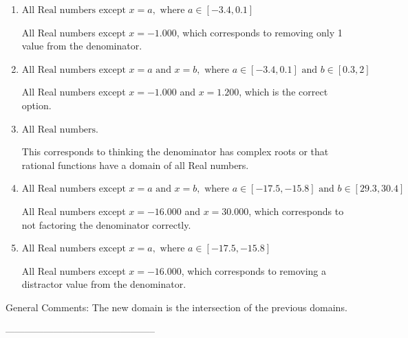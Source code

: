 \documentclass{article}[14pt]
\begin{document}
\begin{enumerate}[label=\Alph*.] 
\item $ \text{All Real numbers except } x = a, \text{ where } a \in [-3.4, 0.1] $ 

 All Real numbers except $x = -1.000$, which corresponds to removing only 1 value from the denominator. 
\item $ \text{All Real numbers except } x = a \text{ and } x = b, \text{ where } a \in [-3.4, 0.1] \text{ and } b \in [0.3, 2] $ 

 All Real numbers except $x = -1.000$ and $x = 1.200$, which is the correct option. 
\item $ \text{All Real numbers.} $ 

 This corresponds to thinking the denominator has complex roots or that rational functions have a domain of all Real numbers. 
\item $ \text{All Real numbers except } x = a \text{ and } x = b, \text{ where } a \in [-17.5, -15.8] \text{ and } b \in [29.3, 30.4] $ 

 All Real numbers except $x = -16.000$ and $x = 30.000$, which corresponds to not factoring the denominator correctly. 
\item $ \text{All Real numbers except } x = a, \text{ where } a \in [-17.5, -15.8] $ 

 All Real numbers except $x = -16.000$, which corresponds to removing a distractor value from the denominator. 
\end{enumerate} 
 
General Comments: The new domain is the intersection of the previous domains.

-----------------------------------------------
\end{document}
